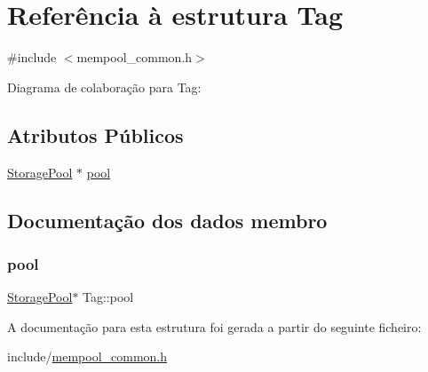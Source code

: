 \hypertarget{structTag}{}\section{Referência à estrutura Tag}
\label{structTag}


{\ttfamily \#include $<$mempool\+\_\+common.\+h$>$}



Diagrama de colaboração para Tag\+:
\subsection*{Atributos Públicos}
\begin{DoxyCompactItemize}
\item 
\hyperlink{classStoragePool}{Storage\+Pool} $\ast$ \hyperlink{structTag_aa4adbc74180401c6e0bff0a4c429f37e}{pool}
\end{DoxyCompactItemize}


\subsection{Documentação dos dados membro}
\mbox{\label{structTag_aa4adbc74180401c6e0bff0a4c429f37e}} 
\subsubsection{\texorpdfstring{pool}{pool}}
{\footnotesize\ttfamily \hyperlink{classStoragePool}{Storage\+Pool}$\ast$ Tag\+::pool}



A documentação para esta estrutura foi gerada a partir do seguinte ficheiro\+:\begin{DoxyCompactItemize}
\item 
include/\hyperlink{mempool__common_8h}{mempool\+\_\+common.\+h}\end{DoxyCompactItemize}
